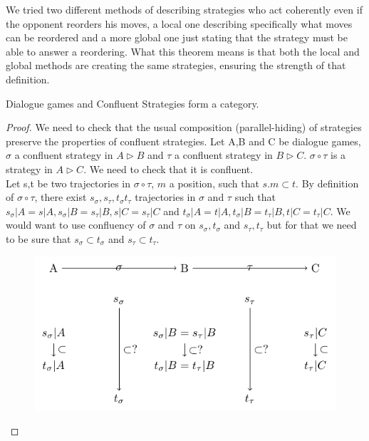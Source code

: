 \documentclass[a4paper,UKenglish]{lipics}
\begin{document}
We tried two different methods of describing strategies who act coherently even if the opponent reorders his moves, a local one describing specifically what moves can be reordered and a more global one just stating that the strategy must be able to answer a reordering. What this theorem means is that both the local and global methods are creating the same strategies, ensuring the strength of that definition.  

\begin{theorem}
 Dialogue games and Confluent Strategies form a category.
\end{theorem}
\begin{proof}
We need to check that the usual composition (parallel-hiding) of strategies preserve the properties of confluent strategies.
Let A,B and C be  dialogue games, $\sigma$ a confluent strategy in $A\triangleright B$ and $\tau$ a confluent strategy in $B\triangleright C$. $\sigma \circ \tau$ is a strategy in $A \triangleright C$. We need to check that it is confluent.\\

Let s,t be two trajectories in $\sigma \circ \tau$, $m$ a position, such that $s.m \subset t$. By definition of $\sigma \circ \tau$, there exist $s_\sigma, s_\tau, t_\sigma t_\tau$ trajectories in $\sigma$ and $\tau$ such that $s_\sigma|A=s|A, s_\sigma|B=s_\tau|B, s|C=s_\tau|C$ and $t_\sigma|A=t|A, t_\sigma|B=t_\tau|B, t|C=t_\tau|C$.
We would want to use confluency of $\sigma$ and $\tau$ on $s_\sigma, t_\sigma$ and $s_\tau, t_\tau$ but for that we need to be sure that $s_\sigma \subset t_\sigma$ and $s_\tau \subset t_\tau$.
\begin{figure}[H]\centering\includegraphics[scale=0.8]{confluency_and_composition_1.pdf}\caption{} \end{figure}


\end{proof}
\end{document}
